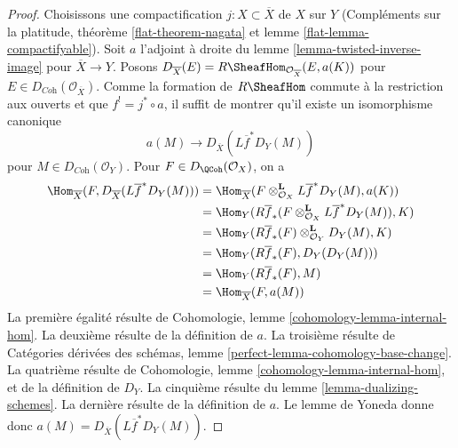 \begin{proof}
Choisissons une compactification $j : X \subset \overline{X}$ de $X$ sur $Y$ (Compléments sur la platitude, théorème \ref{flat-theorem-nagata} et lemme \ref{flat-lemma-compactifyable}). Soit $a$ l'adjoint à droite du lemme \ref{lemma-twisted-inverse-image} pour $\overline{X} \to Y$. Posons
$D_{\overline{X}}(E) = R\SheafHom_{\mathcal{O}_{\overline{X}}}(E, a(K))$
pour $E \in D_{\textit{Coh}}(\mathcal{O}_{\overline{X}})$. Comme la formation de $R\SheafHom$ commute à la restriction aux ouverts et que $f^! = j^* \circ a$, il suffit de montrer qu'il existe un isomorphisme canonique
$$
a(M) \longrightarrow D_{\overline{X}}(L\overline{f}^*D_Y(M))
$$
pour $M \in D_{\textit{Coh}}(\mathcal{O}_Y)$. Pour $F \in D_\QCoh(\mathcal{O}_X)$, on a
\begin{align*}
\Hom_{\overline{X}}(
F, D_{\overline{X}}(L\overline{f}^*D_Y(M)))
& =
\Hom_{\overline{X}}(
F \otimes_{\mathcal{O}_X}^\mathbf{L} L\overline{f}^*D_Y(M), a(K)) \\
& =
\Hom_Y(
R\overline{f}_*(F \otimes_{\mathcal{O}_X}^\mathbf{L} L\overline{f}^*D_Y(M)),
K) \\
& =
\Hom_Y(
R\overline{f}_*(F) \otimes_{\mathcal{O}_Y}^\mathbf{L} D_Y(M),
K) \\
& =
\Hom_Y(
R\overline{f}_*(F), D_Y(D_Y(M))) \\
& =
\Hom_Y(R\overline{f}_*(F), M) \\
& = \Hom_{\overline{X}}(F, a(M))
\end{align*}
La première égalité résulte de Cohomologie, lemme \ref{cohomology-lemma-internal-hom}. La deuxième résulte de la définition de $a$. La troisième résulte de Catégories dérivées des schémas, lemme \ref{perfect-lemma-cohomology-base-change}. La quatrième résulte de Cohomologie, lemme \ref{cohomology-lemma-internal-hom}, et de la définition de $D_Y$. La cinquième résulte du lemme \ref{lemma-dualizing-schemes}. La dernière résulte de la définition de $a$. Le lemme de Yoneda donne donc $a(M) = D_{\overline{X}}(L\overline{f}^*D_Y(M))$.
\end{proof}

